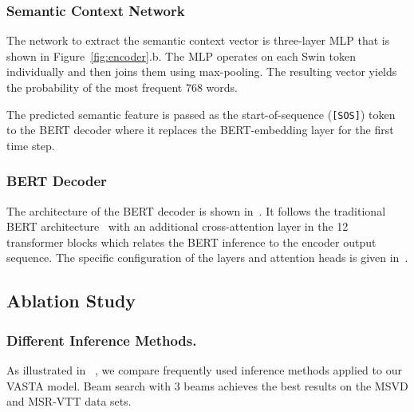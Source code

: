 \documentclass[runningheads,table]{llncs}
\newcommand{\modelName}{VASTA\xspace}
\begin{document}
\subsubsection{Semantic Context Network}

The network to extract the semantic context vector is three-layer MLP that is shown in Figure~\ref{fig:encoder}.b. The MLP operates on each Swin token individually and then joins them using max-pooling. The resulting vector yields the probability of the most frequent $768$ words.

The predicted semantic feature is passed as the start-of-sequence (\texttt{[SOS]}) token to the BERT decoder where it replaces the BERT-embedding layer for the first time step.





\subsubsection{BERT Decoder}

The architecture of the BERT decoder is shown in~.
It follows the traditional BERT architecture~\cite{devlin2018bert} with an additional cross-attention layer in the 12 transformer blocks which relates the BERT inference to the encoder output sequence. The specific configuration of the layers and attention heads is given in~.

\subsection{Ablation Study}

\subsubsection{Different Inference Methods.}
As illustrated in ~, we compare frequently used inference methods applied to our \modelName{} model. Beam search with 3 beams achieves the best results on the MSVD and MSR-VTT data sets.
\end{document}
